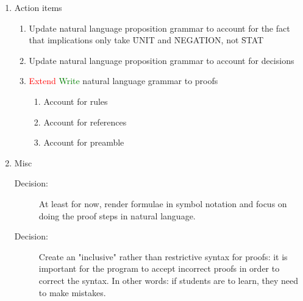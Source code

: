 \documentclass[a4paper]{article}
\begin{document}
\begin{enumerate}
  \item Action items
    \begin{enumerate}[\HollowBox]
      \item[\CrossedBox] Update natural language proposition grammar 
      to account for the fact that
      implications only take \f{UNIT} and \f{NEGATION}, not \f{STAT}
      \item[\CrossedBox] Update natural language proposition grammar to 
      account for decisions
      \item \textcolor{Red}{Extend} \textcolor{Green}{Write} natural
      language grammar to proofs
        \begin{enumerate}[\HollowBox]
          \item Account for rules
          \item Account for references
          \item Account for preamble
        \end{enumerate}
    \end{enumerate}

  \item Misc
    \begin{description}
      \item[Decision:] At least for now, render formulae in symbol notation
      and focus on doing the proof steps in natural language.

      \item[Decision:] Create an "inclusive" rather than restrictive syntax 
      for proofs: it is important for the program to accept incorrect 
      proofs in order to correct the syntax. In other words: if students are
      to learn, they need to make mistakes.
    \end{description}
\end{enumerate}

\label{LastBody}
\end{document}
